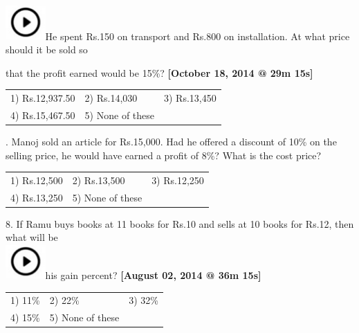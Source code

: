 \documentclass{article}
\begin{document}
	\noindent \noindent \\ \includegraphics*[width=0.60in, height=0.52in]{images/image1}He spent Rs.150 on transport and Rs.800 on installation. At what price should it be sold so
	
	\noindent that the profit earned would be 15\%?                   \textbf{[October 18, 2014 @ 29m 15s]}
	
	\noindent 
	
	\noindent  
	\begin{tabular}{p{1.7in} p{1.6in} p{1.6in}} \\ 
 1) Rs.12,937.50       & 2) Rs.14,030     & 3) Rs.13,450     \\
4) Rs.15,467.50 & 5) None of these  \\
\end{tabular}
	
	\noindent 
	
	\noindent 
	
	\noindent 
	
	.   Manoj sold an article for Rs.15,000. Had he offered a discount of 10\% on the selling price, he would have earned a profit of 8\%? What is the cost price?
	
	\noindent  
	\begin{tabular}{p{1.7in} p{1.6in} p{1.6in}} \\ 
 1) Rs.12,500                         & 2) Rs.13,500     & 3) Rs.12,250     \\
4) Rs.13,250     & 5) None of these  \\
\end{tabular}
	
	\noindent 
	
	\noindent 
	
	\noindent 
	
	8.   If Ramu buys books at 11 books for Rs.10 and sells at 10 books for Rs.12, then what will be \noindent \\ \includegraphics*[width=0.60in, height=0.52in]{images/image1}his  gain percent? \textbf{[August 02, 2014 @ 36m 15s]}
	
	\noindent  
	\begin{tabular}{p{1.7in} p{1.6in} p{1.6in}} \\ 
 1) 11\%                    & 2) 22\%              & 3) 32\%              \\
4) 15\%              & 5) None of these  \\
\end{tabular}
	
\end{document}
